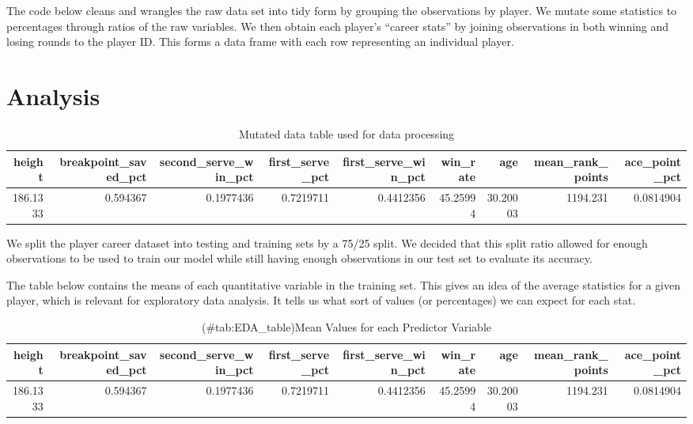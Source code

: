 \documentclass[
]{article}
\begin{document}
The code below cleans and wrangles the raw data set into tidy form by grouping the observations by player. We mutate some statistics to percentages through ratios of the raw variables. We then obtain each player's ``career stats'' by joining observations in both winning and losing rounds to the player ID. This forms a data frame with each row representing an individual player.

\hypertarget{analysis}{%
\section{Analysis}\label{analysis}}

\begin{table}

\caption{\label{tab:Analysis}Mutated data table used for data processing}
\centering
\begin{tabular}[t]{r|r|r|r|r|r|r|r|r}
\hline
height & breakpoint\_saved\_pct & second\_serve\_win\_pct & first\_serve\_pct & first\_serve\_win\_pct & win\_rate & age & mean\_rank\_points & ace\_point\_pct\\
\hline
186.1333 & 0.594367 & 0.1977436 & 0.7219711 & 0.4412356 & 45.25994 & 30.20003 & 1194.231 & 0.0814904\\
\hline
\end{tabular}
\end{table}

We split the player career dataset into testing and training sets by a 75/25 split. We decided that this split ratio allowed for enough observations to be used to train our model while still having enough observations in our test set to evaluate its accuracy.

The table below contains the means of each quantitative variable in the training set. This gives an idea of the average statistics for a given player, which is relevant for exploratory data analysis. It tells us what sort of values (or percentages) we can expect for each stat.

\begin{table}

\caption{(\#tab:EDA_table)Mean Values for each Predictor Variable}
\centering
\begin{tabular}[t]{r|r|r|r|r|r|r|r|r}
\hline
height & breakpoint\_saved\_pct & second\_serve\_win\_pct & first\_serve\_pct & first\_serve\_win\_pct & win\_rate & age & mean\_rank\_points & ace\_point\_pct\\
\hline
186.1333 & 0.594367 & 0.1977436 & 0.7219711 & 0.4412356 & 45.25994 & 30.20003 & 1194.231 & 0.0814904\\
\hline
\end{tabular}
\end{table}
\end{document}

